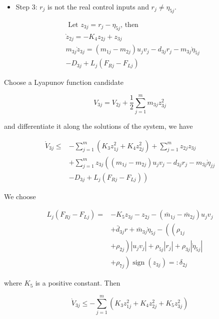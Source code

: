 \documentclass[10pt]{article}
\begin{document}
\begin{itemize}
  \item Step 3: $r_{j}$ is not the real control inputs and $r_{j} \neq \eta_{5 j}$.
\end{itemize}

$$
\begin{aligned}
& \text { Let } z_{3 j}=r_{j}-\eta_{5 j} \text {, then } \\
& \grave{z}_{2 j}=-K_{4} z_{2 j}+z_{3 j} \\
& m_{3 j} \grave{z}_{3 j}=\left(m_{1 j}-m_{2 j}\right) u_{j} v_{j}-d_{3 j} r_{j}-m_{3 j} \grave{\eta}_{5 j} \\
& -D_{3 j}+L_{j}\left(F_{R j}-F_{L j}\right)
\end{aligned}
$$

Choose a Lyapunov function candidate

$$
V_{3 j}=V_{2 j}+\frac{1}{2} \sum_{j=1}^{m} m_{3 j} z_{3 j}^{2}
$$

and differentiate it along the solutions of the system, we have

$$
\begin{aligned}
\grave{V}_{3 j} \leq & -\sum_{j=1}^{m}\left(K_{3} z_{1 j}^{2}+K_{4} z_{2 j}^{2}\right)+\sum_{j=1}^{m} z_{2 j} z_{3 j} \\
& +\sum_{j=1}^{m} z_{3 j}\left(\left(m_{1 j}-m_{2 j}\right) u_{j} v_{j}-d_{3 j} r_{j}-m_{3 j} \grave{\eta}_{j j}\right. \\
& \left.-D_{3 j}+L_{j}\left(F_{R j}-F_{L j}\right)\right)
\end{aligned}
$$

We choose

$$
\begin{aligned}
L_{j}\left(F_{R j}-F_{L j}\right)= & -K_{5} z_{3 j}-z_{2 j}-\left(\bar{m}_{1 j}-\bar{m}_{2 j}\right) u_{j} v_{j} \\
& +\bar{d}_{3 j} r+\bar{m}_{3 j} \grave{\eta}_{5 j}-\left(\left(\rho_{1 j}\right.\right. \\
& \left.+\rho_{2 j}\right)\left|u_{j} v_{j}\right|+\rho_{5 j}\left|r_{j}\right|+\rho_{3 j}\left|\grave{\eta}_{5 j}\right| \\
& \left.+\rho_{7 j}\right) \operatorname{sign}\left(z_{3 j}\right)=: \delta_{2 j}
\end{aligned}
$$

where $K_{5}$ is a positive constant. Then

$$
\grave{V}_{3 j} \leq-\sum_{j=1}^{m}\left(K_{3} z_{1 j}^{2}+K_{4} z_{2 j}^{2}+K_{5} z_{3 j}^{2}\right)
$$
\end{document}
